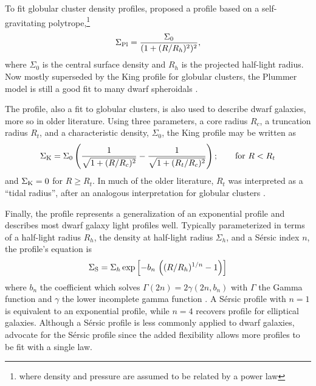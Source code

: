 To fit globular cluster density profiles, \citet{plummer1911} proposed a
profile based on a self-gravitating polytrope,\footnote{where density
  and pressure are assumed to be related by a power law}
\begin{equation}{
\Sigma_{\rm Pl} = \frac{\Sigma_0}{(1 + (R/R_h)^2)^2},
}\end{equation} where \(\Sigma_0\) is the central surface density and
\(R_h\) is the projected half-light radius. Now mostly superseded by the
King profile for globular clusters, the Plummer model is still a good
fit to many dwarf spheroidals \citep[e.g.,][]{moskowitz+walker2020}.

The \citet{king1962} profile, also a fit to globular clusters, is also
used to describe dwarf galaxies, more so in older literature. Using
three parameters, a core radius \(R_c\), a truncation radius \(R_t\),
and a characteristic density, \(\Sigma_0\), the King profile may be
written as \begin{equation}{
\Sigma_{\rm K} = \Sigma_0\left(\frac{1}{\sqrt{1 + (R/R_c)^2}} - \frac{1}{\sqrt{1+(R_t/R_c)^2}}\right); \qquad \text{for } R<R_t
}\end{equation} and \(\Sigma_{\rm K}=0\) for \(R \geq R_t\). In much of
the older literature, \(R_t\) was interpreted as a ``tidal radius'',
after an analogous interpretation for globular clusters
\citep[e.g.,][]{hodge1961, IH1995}.

Finally, the \citet{sersic1963} profile represents a generalization of
an exponential profile and describes most dwarf galaxy light profiles
well. Typically parameterized in terms of a half-light radius \(R_h\),
the density at half-light radius \(\Sigma_h\), and a Sérsic index \(n\),
the profile's equation is \begin{equation}{
\Sigma_{\rm S} = \Sigma_h \exp\left[-b_n \,  \left((R/R_h)^{1/n} - 1\right)\right]
}\end{equation} where \(b_n\) the coefficient which solves
\(\Gamma(2n) = 2\gamma(2n, b_n)\) with \(\Gamma\) the Gamma function and
\(\gamma\) the lower incomplete gamma function
\citep{graham+driver2005}. A Sérsic profile with \(n=1\) is equivalent
to an exponential profile, while \(n=4\) recovers
 profile for elliptical galaxies. Although a
Sérsic profile is less commonly applied to dwarf galaxies,
\citet{munoz+2018} advocate for the Sérsic profile since the added
flexibility allows more profiles to be fit with a single law.

